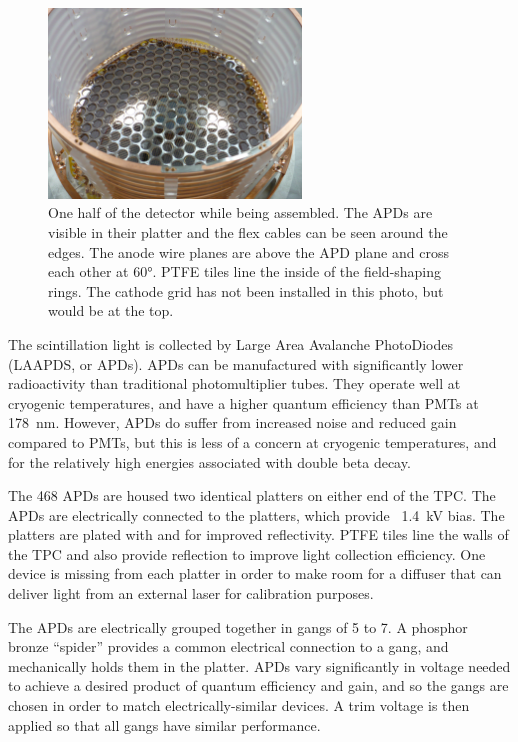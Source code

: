 \documentclass[herrin-thesis.tex]{subfiles}
\begin{document}
\begin{figure}
\centering
\includegraphics[width=0.6\textwidth]{./photos/detector_half.jpg}
\caption[Half of the EXO-200 detector]{One half of the detector while being assembled. The APDs are visible in their platter and the flex cables can be seen around the edges. The anode wire planes are above the APD plane and cross each other at \ang{60}. PTFE tiles line the inside of the field-shaping rings. The cathode grid has not been installed in this photo, but would be at the top.}
\label{fig:detector_half_photo}
\end{figure}

The scintillation light is collected by Large Area Avalanche PhotoDiodes (LAAPDS, or APDs). APDs can be manufactured with significantly lower radioactivity than traditional photomultiplier tubes. They operate well at cryogenic temperatures, and have a higher quantum efficiency than PMTs at \SI{178}{\nm}. However, APDs do suffer from increased noise and reduced gain compared to PMTs, but this is less of a concern at cryogenic temperatures, and for the relatively high energies associated with double beta decay.

The 468 APDs are housed two identical platters on either end of the TPC. The APDs are electrically connected to the platters, which provide \about~\SI{1.4}{\kV} bias. The platters are plated with  and  for improved reflectivity. PTFE tiles line the walls of the TPC and also provide reflection to improve light collection efficiency. One device is missing from each platter in order to make room for a diffuser that can deliver light from an external laser for calibration purposes.

The APDs are electrically grouped together in gangs of 5 to 7. A phosphor bronze ``spider'' provides a common electrical connection to a gang, and mechanically holds them in the platter. APDs vary significantly in voltage needed to achieve a desired product of quantum efficiency and gain, and so the gangs are chosen in order to match electrically-similar devices\cite{Neilson:2009fk}. A trim voltage is then applied so that all gangs have similar performance.
\end{document}
